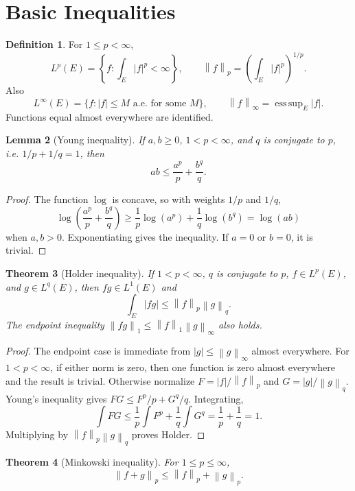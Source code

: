 \documentclass[11pt,openany]{book}
\numberwithin{equation}{chapter}
\theoremstyle{definition}
\newtheorem{definition}{Definition}[chapter]
\theoremstyle{plain}
\newtheorem{theorem}[definition]{Theorem}
\newtheorem{lemma}[definition]{Lemma}
\theoremstyle{remark}
\newcommand{\1}{\mathbf{1}}
\newcommand{\abs}[1]{\left\lvert #1\right\rvert}
\newcommand{\norm}[1]{\left\lVert #1\right\rVert}
\DeclareMathOperator*{\esssup}{ess\,sup}
\begin{document}
\section{Basic Inequalities}

\begin{definition}
For \(1\le p<\infty\),
\[
    L^p(E)=\left\{f:\int_E\abs f^p<\infty\right\},
    \qquad
    \norm f_p=\left(\int_E\abs f^p\right)^{1/p}.
\]
Also
\[
    L^\infty(E)=\{f:\abs f\le M\text{ a.e. for some }M\},
    \qquad
    \norm f_\infty=\esssup_E\abs f.
\]
Functions equal almost everywhere are identified.
\end{definition}

\begin{lemma}[Young inequality]
If \(a,b\ge0\), \(1<p<\infty\), and \(q\) is conjugate to \(p\), i.e. \(1/p+1/q=1\), then
\[
    ab\le \frac{a^p}{p}+\frac{b^q}{q}.
\]
\end{lemma}

\begin{proof}
The function \(\log\) is concave, so with weights \(1/p\) and \(1/q\),
\[
    \log\left(\frac{a^p}{p}+\frac{b^q}{q}\right)
    \ge \frac1p\log(a^p)+\frac1q\log(b^q)=\log(ab)
\]
when \(a,b>0\).  Exponentiating gives the inequality.  If \(a=0\) or \(b=0\), it is trivial.
\end{proof}

\begin{theorem}[Holder inequality]
If \(1<p<\infty\), \(q\) is conjugate to \(p\), \(f\in L^p(E)\), and \(g\in L^q(E)\), then \(fg\in L^1(E)\) and
\[
    \int_E\abs{fg}\le \norm f_p\norm g_q.
\]
The endpoint inequality \(\norm{fg}_1\le\norm f_1\norm g_\infty\) also holds.
\end{theorem}

\begin{proof}
The endpoint case is immediate from \(\abs g\le\norm g_\infty\) almost everywhere.  For \(1<p<\infty\), if either norm is zero, then one function is zero almost everywhere and the result is trivial.  Otherwise normalize \(F=\abs f/\norm f_p\) and \(G=\abs g/\norm g_q\).  Young's inequality gives \(FG\le F^p/p+G^q/q\).  Integrating,
\[
    \int FG\le \frac1p\int F^p+\frac1q\int G^q=\frac1p+\frac1q=1.
\]
Multiplying by \(\norm f_p\norm g_q\) proves Holder.
\end{proof}

\begin{theorem}[Minkowski inequality]
For \(1\le p\le\infty\),
\[
    \norm{f+g}_p\le\norm f_p+\norm g_p.
\]
\end{theorem}
\end{document}
